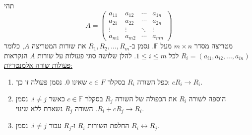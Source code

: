 \documentclass[
  hebrew,
  12pt,
  a4paper,
  oneside]{book}
\theoremstyle{definition}
\theoremstyle{remark}
\theoremstyle{plain}
\theoremstyle{remark}
\begin{document}
\begin{definition}

תהי \[A=\begin{pmatrix}a_{11} & a_{12} & \cdots & a_{1n}\\
a_{21} & a_{22} & \cdots & a_{2n}\\
\vdots & \vdots & \ddots & \vdots\\
a_{m1} & a_{m2} & \cdots & a_{mn}
\end{pmatrix}\] מטריצה מסדר \(m\times n\) מעל \(\mathbb F\). נסמן
ב-\(R_1,R_2,...,R_m\) את שורות המטריצה \(A\), כלומר
\(R_{i}=(a_{i1},a_{i2},...,a_{in})\) לכל \(1\leq i\leq m\). להלן שלושה
סוגי פעולות על שורות \(A\) הנקראות \ul{פעולות שורה אלמנטריות:}

\begin{enumerate}
\def\labelenumi{\arabic{enumi}.}
\item
  כפל השורה \(R_{i}\) בסקלר \(c\in F\) שאינו \(0\). נסמן פעולה זו כך:
  \(cR_{i}\rightarrow R_{i}\).
\item
  הוספה לשורה \(R_{i}\) את הכפולה של השורה \(R_{j}\) בסקלר
  \(c\in \mathbb F\) כאשר \(i\neq j\). נסמן
  \(R_{i}+cR_{j}\rightarrow R_{i}\). השורה \(R_{j}\) נשארת ללא שינוי.
\item
  החלפת השורות \(R_{i}\) ו-\(R_{j}\) עבור \(i\neq j\). נסמן
  \(R_{i}\leftrightarrow R_{j}\).
\end{enumerate}

\end{definition}
\end{document}
